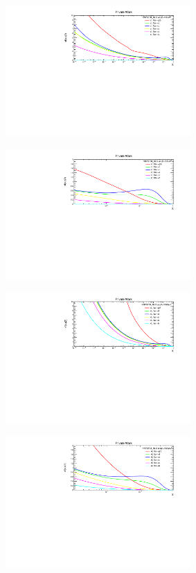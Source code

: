 \begin{figure}[H]
\centering
\begin{subfigure}{0.45\textwidth}
\includegraphics[height=5cm ,width=\textwidth]{chapter4/xfx10gev_nlo.pdf}
\vspace*{-8mm}
\caption{}
\end{subfigure}
\begin{subfigure}{0.45\textwidth}
\includegraphics[height=5cm, width=\textwidth]{chapter4/xfx10gev_nlo1.pdf}
\vspace*{-8mm}
\caption{}
\end{subfigure}
\begin{subfigure}{0.45\textwidth}
\includegraphics[height=5cm, width=\textwidth]{chapter4/xfx100gev_nlo.pdf}
\vspace*{-8mm}
\caption{}
\end{subfigure}
\begin{subfigure}{0.45\textwidth}
\includegraphics[height=5cm, width=\textwidth]{chapter4/xfx100gev_nlo1.pdf}

\end{subfigure}
\end{figure}
